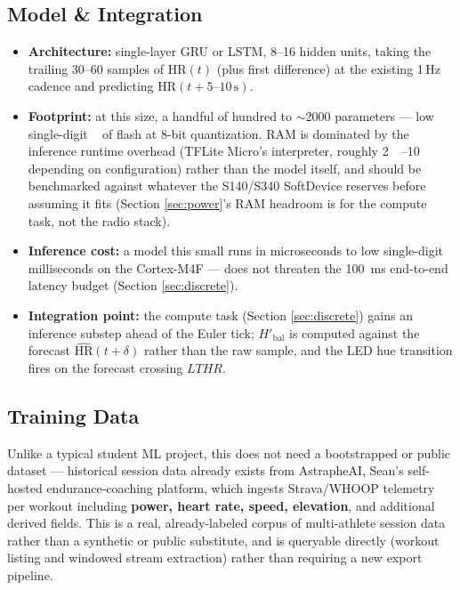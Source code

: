 \documentclass[11pt, letterpaper]{article}
\begin{document}
\subsection{Model \& Integration}

\begin{itemize}
  \item \textbf{Architecture:} single-layer GRU or LSTM, 8--16 hidden units, taking the trailing
    30--60 samples of $\mathrm{HR}(t)$ (plus first difference) at the existing 1\,Hz cadence and
    predicting $\mathrm{HR}(t + 5\text{--}10\,\mathrm{s})$.
  \item \textbf{Footprint:} at this size, a handful of hundred to $\sim$2000 parameters ---
    low single-digit \si{\kilo\byte} of flash at 8-bit quantization. RAM is dominated by the
    inference runtime overhead (TFLite Micro's interpreter, roughly
    \SIrange{2}{10}{\kilo\byte} depending on configuration) rather than the model itself, and
    should be benchmarked against whatever the S140/S340 SoftDevice reserves before assuming
    it fits (Section \ref{sec:power}'s RAM headroom is for the compute task, not the radio
    stack).
  \item \textbf{Inference cost:} a model this small runs in microseconds to low single-digit
    milliseconds on the Cortex-M4F --- does not threaten the \SI{100}{\milli\second} end-to-end
    latency budget (Section \ref{sec:discrete}).
  \item \textbf{Integration point:} the compute task (Section \ref{sec:discrete}) gains an
    inference substep ahead of the Euler tick; $H'_{\mathrm{bal}}$ is computed against the
    forecast $\widehat{\mathrm{HR}}(t+\delta)$ rather than the raw sample, and the LED hue
    transition fires on the forecast crossing $LTHR$.
\end{itemize}

\subsection{Training Data}
\label{sec:ml-data}

Unlike a typical student ML project, this does not need a bootstrapped or public dataset ---
historical session data already exists from AstrapheAI, Sean's self-hosted endurance-coaching
platform, which ingests Strava/WHOOP telemetry per workout including \textbf{power, heart rate,
speed, elevation}, and additional derived fields. This is a real, already-labeled corpus of
multi-athlete session data rather than a synthetic or public substitute, and is queryable
directly (workout listing and windowed stream extraction) rather than requiring a new export
pipeline.
\end{document}

